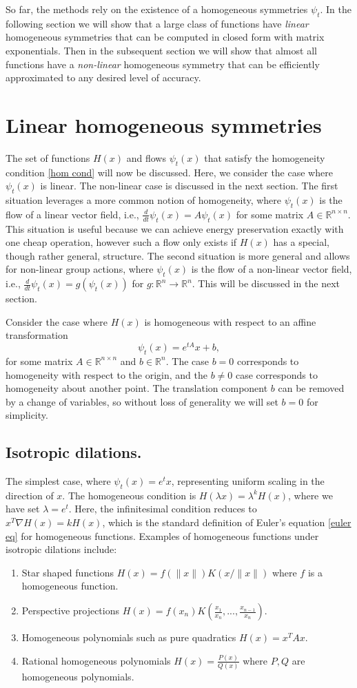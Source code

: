 \documentclass[final,3p,times]{elsarticle}
\newcommand{\R}{\mathbb{R}}
\begin{document}
So far, the methods rely on the existence of a homogeneous symmetries $\psi_t$. In the following section we will show that a large class of functions have \textit{linear} homogeneous symmetries that can be computed in closed form with matrix exponentials. Then in the subsequent section we will show that almost all functions have a \textit{non-linear} homogeneous symmetry that can be efficiently approximated to any desired level of accuracy.

\section{Linear homogeneous symmetries}\label{sec:linear homogeneous symmetries}
The set of functions $H(x)$ and flows $\psi_t(x)$ that satisfy the homogeneity condition \eqref{hom cond} will now be discussed. Here, we consider the case where $\psi_t(x)$ is linear. The non-linear case is discussed in the next section. The first situation leverages a more common notion of homogeneity, where $\psi_t(x)$ is the flow of a linear vector field, i.e., $\frac{d}{dt}\psi_t(x)=A\psi_t(x)$ for some matrix $A\in\R^{n\times n}$. This situation is useful because we can achieve energy preservation exactly with one cheap operation, however such a flow only exists if $H(x)$ has a special, though rather general, structure. The second situation is more general and allows for non-linear group actions, where $\psi_t(x)$ is the flow of a non-linear vector field, i.e., $\frac{d}{dt}\psi_t(x)=g(\psi_t(x))$ for $g:\R^n\to\R^n$. This will be discussed in the next section.

Consider the case where $H(x)$ is homogeneous with respect to an affine transformation $$\psi_t(x)=e^{tA}x + b,$$ for some matrix $A\in\R^{n\times n}$ and $b\in\R^n$. The case $b=0$ corresponds to homogeneity with respect to the origin, and the $b\ne 0$ case corresponds to homogeneity about another point. The translation component $b$ can be removed by a change of variables, so without loss of generality we will set $b=0$ for simplicity. 

\subsection{Isotropic dilations.} The simplest case, where $\psi_t(x)=e^t x$, representing uniform scaling in the direction of $x$. The homogeneous condition is $H(\lambda x)=\lambda^k H(x)$, where we have set $\lambda = e^{t}$. Here, the infinitesimal condition reduces to $x^T\nabla H(x)=k H(x)$, which is the standard definition of Euler's equation \eqref{euler eq} for homogeneous functions. Examples of homogeneous functions under isotropic dilations include: 
\begin{enumerate}
\item Star shaped functions $H(x) = f(\|x\|)K(x/\|x\|)$ where $f$ is a homogeneous function.
\item Perspective projections $H(x) =  f(x_n) K(\frac{x_1}{x_n},..., \frac{x_{n-1}}{x_n})$.
\item Homogeneous polynomials such as pure quadratics $H(x) = x^T A x$. 
\item Rational homogeneous polynomials $H(x) = \frac{P(x)}{Q(x)}$ where $P,Q$ are homogeneous polynomials.
\end{enumerate}
\end{document}
